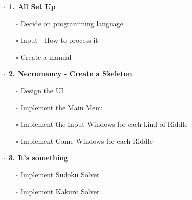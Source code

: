 \documentclass{article}
\begin{document}
	\begin{minipage}[t]{0.45\textwidth}
		\strut\vspace*{-\baselineskip}\newline
		\begin{itemize}
			\item[$\square$] \textbf{1. All Set Up}
			\begin{itemize}
				\item[\rlap{\checkmark}$\square$] Decide on programming language
				\item[$\square$] Input - How to process it
				\item[$\square$] Create a manual
			\end{itemize}
			\item[$\square$] \textbf{2. Necromancy - Create a Skeleton}
			\begin{itemize}
				\item[$\square$] Design the UI
				\item[$\square$] Implement the Main Menu
				\item[$\square$] Implement the Input Windows for each kind of Riddle
				\item[$\square$] Implement Game Windows for each Riddle
			\end{itemize}
			\item[$\square$] \textbf{3. It's something}
			\begin{itemize}
				\item[$\square$] Implement Sudoku Solver
				\item[$\square$] Implement Kakuro Solver
			\end{itemize}
		\end{itemize}
	\end{minipage}
	\hspace*{.1\textwidth}
\end{document}
